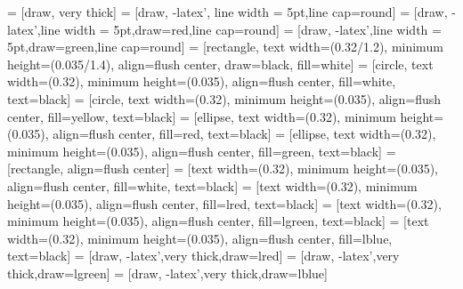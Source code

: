 \usepackage{transparent}
\usepackage{background}
\usepackage{helvet}
\renewcommand*\familydefault{\sfdefault} %
\usepackage[T1]{fontenc}
\usepackage[numbers]{natbib}
\usepackage{calc}
\usepackage[english]{babel}
\usepackage{color}
\usepackage{multicol}
\usepackage{graphicx}
\usepackage[papername=a0paper, left = 1.5cm, right = 1.5cm, top = 1.5cm, bottom = 1.5cm]{geometry}
\usepackage{titlesec}
\usepackage{subfig}
\usepackage{tikz}
\usetikzlibrary{shapes,arrows,positioning}

\def \vs {\vspace{10pt}}
\def \vms {\vspace{-10pt}}
\def \vbs {\vs\vs}
\def \dist {3.5}
\def \bwidth {0.32\textwidth}
\def \bheight {0.035\textheight}
\def \tfont {\fontsize{24}{29}\selectfont}
\def \ffont	{\fontsize{18}{21.6}\selectfont}
\def \lfont {\fontsize{18}{22}\selectfont}
\def \spacer {\vs\par\vfill}

 = [draw, very thick]
 = [draw, -latex', line width = 5pt,line cap=round]
 = [draw, -latex',line width = 5pt,draw=red,line cap=round]
 = [draw, -latex',line width = 5pt,draw=green,line cap=round]
 = [rectangle, text width=(\bwidth/1.2), minimum height=(\bheight/1.4), align=flush center, draw=black, fill=white]
 = [circle, text width=(\bwidth), minimum height=(\bheight), align=flush center, fill=white, text=black]
 = [circle, text width=(\bwidth), minimum height=(\bheight), align=flush center, fill=yellow, text=black]
 = [ellipse, text width=(\bwidth), minimum height=(\bheight), align=flush center, fill=red, text=black]
 = [ellipse, text width=(\bwidth), minimum height=(\bheight), align=flush center, fill=green, text=black]
 = [rectangle, align=flush center]
 = [text width=(\bwidth), minimum height=(\bheight), align=flush center, fill=white, text=black]
 = [text width=(\bwidth), minimum height=(\bheight), align=flush center, fill=lred, text=black]
 = [text width=(\bwidth), minimum height=(\bheight), align=flush center, fill=lgreen, text=black]
 = [text width=(\bwidth), minimum height=(\bheight), align=flush center, fill=lblue, text=black]
 = [draw, -latex',very thick,draw=lred]
 = [draw, -latex',very thick,draw=lgreen]
 = [draw, -latex',very thick,draw=lblue]

